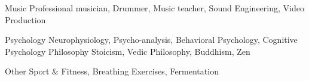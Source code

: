 

\begin{cvskills}
  \cvskill
    {Music} %
    {Professional musician, Drummer, Music teacher, Sound Engineering, Video Production} %

  \cvskill
    {Psychology} %
    {Neurophysiology, Psycho-analysis, Behavioral Psychology, Cognitive Psychology} %
  \cvskill
    {Philosophy} %
    {Stoicism, Vedic Philosophy, Buddhism, Zen} %

  \cvskill
    {Other} %
    {Sport \&{} Fitness, Breathing Exercises, Fermentation} %
\end{cvskills}
